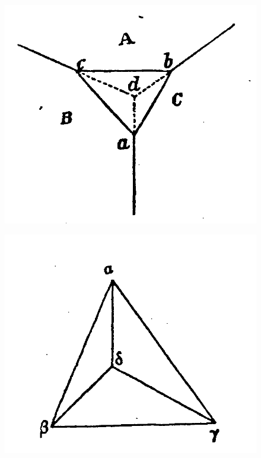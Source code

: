 \documentclass[12pt]{memoir}
\begin{document}
\begin{figure}
\centering
\begin{minipage}{.3\textwidth}
  \centering
  \includegraphics[width=\linewidth]{fig_14}
  \label{fig_14}
\end{minipage}%
\begin{minipage}{.3\textwidth}
  \centering
  \includegraphics[width=\linewidth]{fig_15}
  \label{fig_15}
\end{minipage}

\end{figure}
\end{document}
